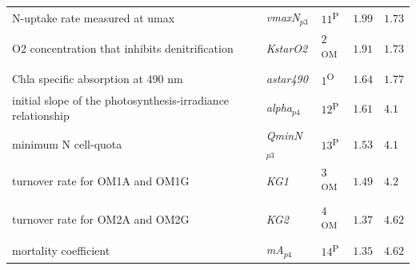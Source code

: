 \documentclass[letterpaper,12pt,oneside]{article}\usepackage[]{graphicx}\usepackage[]{color}
\begin{document}
\begin{table}[!tbp]
{\begin{center}
\begin{tabular}{lllll}
\footnotesize{N-uptake rate measured at umax}&\footnotesize{\textit{vmaxN$_{p3}$}}&$11$\textsuperscript{P}&$1.99$&$1.73$\tabularnewline
\footnotesize{O2 concentration that inhibits denitrification}&\footnotesize{\textit{KstarO2}}&$2$\textsuperscript{OM}&$1.91$&$1.73$\tabularnewline
\footnotesize{Chla specific absorption at 490 nm}&\footnotesize{\textit{astar490}}&$1$\textsuperscript{O}&$1.64$&$1.77$\tabularnewline
\footnotesize{initial slope of the photosynthesis-irradiance relationship}&\footnotesize{\textit{alpha$_{p4}$}}&$12$\textsuperscript{P}&$1.61$&$4.1$\tabularnewline
\footnotesize{minimum N cell-quota}&\footnotesize{\textit{QminN$_{p3}$}}&$13$\textsuperscript{P}&$1.53$&$4.1$\tabularnewline
\footnotesize{turnover rate for OM1A and OM1G}&\footnotesize{\textit{KG1}}&$3$\textsuperscript{OM}&$1.49$&$4.2$\tabularnewline
\footnotesize{turnover rate for OM2A and OM2G}&\footnotesize{\textit{KG2}}&$4$\textsuperscript{OM}&$1.37$&$4.62$\tabularnewline
\footnotesize{mortality coefficient}&\footnotesize{\textit{mA$_{p4}$}}&$14$\textsuperscript{P}&$1.35$&$4.62$\tabularnewline
\hline
\end{tabular}\end{center}}

\end{table}
\end{document}
